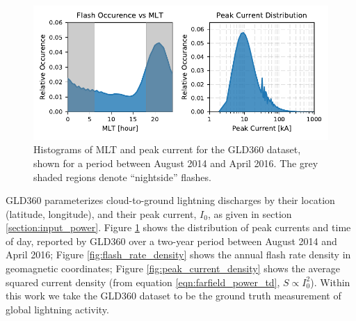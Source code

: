 \begin{figure}[t]
\begin{center}
\includegraphics{figures/MLT_and_IO_distribution.pdf}
\end{center}
\caption[Distributions of peak current and MLT for the GLD360 dataset]{Histograms of MLT and peak current for the GLD360 dataset, shown for a period between August 2014 and April 2016. The grey shaded regions denote ``nightside'' flashes.}
\label{fig:Io_and_MLT}
\end{figure}


GLD360 parameterizes cloud-to-ground lightning discharges by their location (latitude, longitude), and their peak current, $I_0$, as given in section \ref{section:input_power}. Figure \ref{fig:Io_and_MLT} shows the distribution of peak currents and time of day, reported by GLD360 over a two-year period between August 2014 and April 2016; Figure \ref{fig:flash_rate_density} shows the annual flash rate density in geomagnetic coordinates; Figure \ref{fig:peak_current_density} shows the average squared current density (from equation \eqref{eqn:farfield_power_td}, $S \propto I_0^2$). Within this work we take the GLD360 dataset to be the ground truth measurement of global lightning activity.





